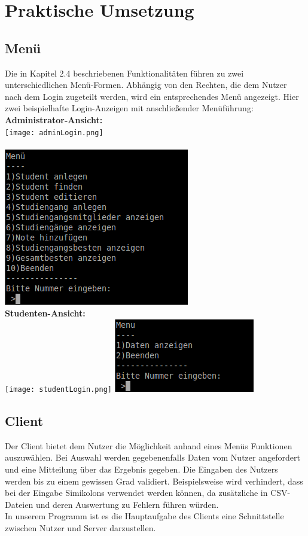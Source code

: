 \documentclass{scrartcl}
\begin{document}
\newpage
		
\section{Praktische Umsetzung}
	\subsection{Menü}
		Die in Kapitel 2.4 beschriebenen Funktionalitäten führen zu zwei unterschiedlichen Menü-Formen. Abhängig von den Rechten, die dem Nutzer nach dem Login zugeteilt werden, wird ein entsprechendes Menü angezeigt. Hier zwei beispielhafte Login-Anzeigen mit anschließender Menüführung:\\
		
		\textbf{Administrator-Ansicht:}\\

		\texttt{[image: adminLogin.png]}\\
		 \\
		\includegraphics[scale=1]{admin.png}\\

		\textbf{Studenten-Ansicht:}\\

		\texttt{[image: studentLogin.png]}
		\includegraphics[scale=1]{student.png}\\		
	\subsection{Client}
		Der Client bietet dem Nutzer die Möglichkeit anhand eines Menüs Funktionen auszuwählen. Bei Auswahl werden gegebenenfalls Daten vom Nutzer angefordert und eine Mitteilung über das Ergebnis gegeben. Die Eingaben des Nutzers werden bis zu einem gewissen Grad validiert. Beispielsweise wird verhindert, dass bei der Eingabe Simikolons verwendet werden können, da zusätzliche in CSV-Dateien und deren Auswertung zu Fehlern führen würden.\\
		In unserem Programm ist es die Hauptaufgabe des Clients eine Schnittstelle zwischen Nutzer und Server darzustellen.
\end{document}
